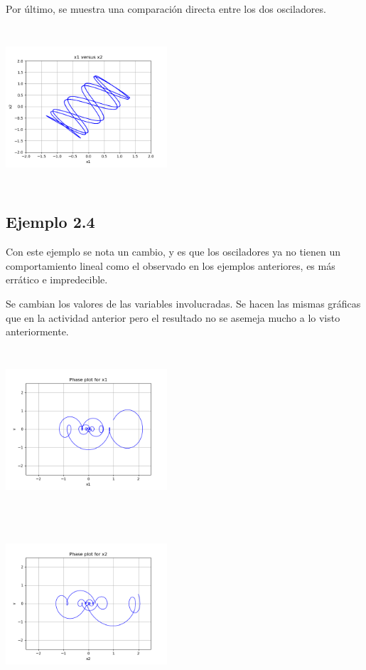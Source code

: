\documentclass{article}
\begin{document}
Por último, se muestra una comparación directa entre los dos osciladores.
\begin{center}
  \includegraphics[width=6cm, height=6cm]{ej2_36.png}
\end{center}

\subsection{Ejemplo 2.4}

Con este ejemplo se nota un cambio, y es que los osciladores ya no tienen un comportamiento lineal como el observado en los ejemplos anteriores, es más errático e impredecible.

Se cambian los valores de las variables involucradas. Se hacen las mismas gráficas que en la actividad anterior pero el resultado no se asemeja mucho a lo visto anteriormente. 
\begin{center}
  \includegraphics[width=6cm, height=6cm]{ej2_41.png}
\end{center}

\begin{center}
  \includegraphics[width=6cm, height=6cm]{ej2_42.png}
\end{center}
\end{document}
